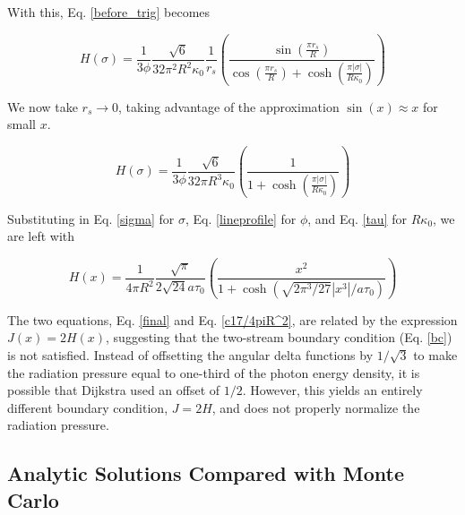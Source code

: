 \documentclass[onecolumn]{aastex63}
\begin{document}
With this, Eq. \ref{before_trig} becomes

\begin{equation} \label{after_trig}
    H(\sigma) = \frac{1}{3 \phi} \frac{\sqrt{6}}{32 \pi^2 R^2 \kappa_0} \frac{1}{r_s} \left(\frac{\sin{\left(\frac{\pi r_s}{R}\right)}}{\cos{\left(\frac{\pi r_s}{R}\right)} + \cosh{\left(\frac{\pi |\sigma|}{R\kappa_0}\right)}}\right)
\end{equation}

We now take $r_s \rightarrow 0$, taking advantage of the approximation $\sin(x) \approx x$ for small $x$.

\begin{equation}
    H(\sigma) = \frac{1}{3 \phi} \frac{\sqrt{6}}{32 \pi R^3 \kappa_0} \left(\frac{1}{1 + \cosh{\left(\frac{\pi |\sigma|}{R\kappa_0}\right)}}\right)
\end{equation}

Substituting in Eq. \ref{sigma} for $\sigma$, Eq. \ref{lineprofile} for $\phi$, and Eq. \ref{tau} for $R \kappa_0$, we are left with

\begin{equation} \label{final}
    H(x) = \frac{1}{4\pi R^2}\frac{\sqrt{\pi}}{2\sqrt{24}a\tau_0} \left(\frac{x^2}{1 + \cosh{\left(\sqrt{2\pi^3/27}|x^3|/a\tau_0\right)}}\right)
\end{equation}

The two equations, Eq. \ref{final} and Eq. \ref{c17/4piR^2}, are related by the expression $J(x) = 2 H(x)$, suggesting that the two-stream boundary condition (Eq. \ref{bc}) is not satisfied. Instead of offsetting the angular delta functions by $1/\sqrt{3}$ to make the radiation pressure equal to one-third of the photon energy density, it is possible that Dijkstra used an offset of $1/2$. However, this yields an entirely different boundary condition, $J = 2H$, and does not properly normalize the radiation pressure.

\subsection{Analytic Solutions Compared with Monte Carlo}
\end{document}
